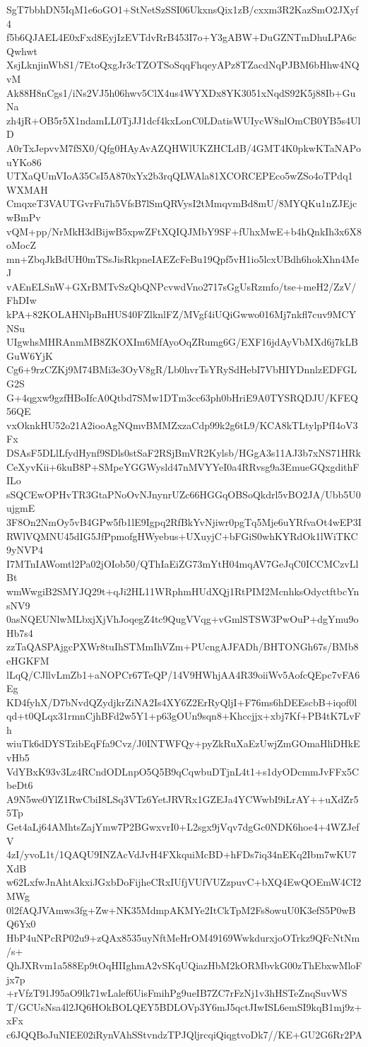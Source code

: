 SgT7bbhDN5IqM1e6oGO1+StNetSzSSI06UkxnsQix1zB/cxxm3R2KazSmO2JXyf4
f5b6QJAEL4E0xFxd8EyjIzEVTdvRrB453I7o+Y3gABW+DuGZNTmDhuLPA6cQwhwt
XsjLknjinWbS1/7EtoQxgJr3cTZOTSoSqqFhqeyAPz8TZacdNqPJBM6bHhw4NQvM
Ak88H8nCgs1/iNs2VJ5h06hwv5ClX4us4WYXDx8YK3051xNqdS92K5j88Ib+GuNa
zh4jR+OB5r5X1ndamLL0TjJJ1dcf4kxLonC0LDatisWUIycW8nlOmCB0YB5s4UlD
A0rTxJepvvM7fSX0/Qfg0HAyAvAZQHWlUKZHCLdB/4GMT4K0pkwKTaNAPouYKo86
UTXaQUmVIoA35CsI5A870xYx2b3rqQLWAla81XCORCEPEco5wZSo4oTPdq1WXMAH
CmqxeT3VAUTGvrFu7h5VfsB7lSmQRVysI2tMmqvmBd8mU/8MYQKu1nZJEjcwBmPv
vQM+pp/NrMkH3dBijwB5xpwZFtXQIQJMbY9SF+fUhxMwE+b4hQnkIh3x6X8oMocZ
mn+ZbqJkBdUH0mTSsJisRkpneIAEZcFeBu19Qpf5vH1io5lcxUBdh6hokXhn4MeJ
vAEnELSnW+GXrBMTvSzQbQNPcvwdVno2717sGgUsRzmfo/tse+meH2/ZzV/FhDIw
kPA+82KOLAHNlpBnHUS40FZlknlFZ/MVgf4iUQiGwwo016Mj7nkfl7cuv9MCYNSu
UIgwhsMHRAnmMB8ZKOXIm6MfAyoOqZRumg6G/EXF16jdAyVbMXd6j7kLBGuW6YjK
Cg6+9rzCZKj9M74BMi3e3OyV8gR/Lb0hvrTsYRySdHebI7VbHIYDnnlzEDFGLG2S
G+4qgxw9gzfHBoIfcA0Qtbd7SMw1DTm3cc63ph0bHriE9A0TYSRQDJU/KFEQ56QE
vxOknkHU52o21A2iooAgNQmvBMMZxzaCdp99k2g6tL9/KCA8kTLtylpPfI4oV3Fx
DSAsF5DLlLfydHynf9SDls0stSaF2RSjBmVR2Kylsb/HGgA3s11AJ3b7xNS71HRk
CeXyvKii+6kuB8P+SMpeYGGWysld47nMVYYeI0a4RRvsg9a3EmueGQxgdithFILo
sSQCEwOPHvTR3GtaPNoOvNJnynrUZc66HGGqOBSoQkdrl5vBO2JA/Ubb5U0ujgmE
3F8On2NmOy5vB4GPw5fb1lE9Igpq2RfBkYvNjiwr0pgTq5Mje6uYRfvaOt4wEP3I
RWlVQMNU45dIG5JfPpmofgHWyebus+UXuyjC+bFGiS0whKYRdOk1lWiTKC9yNVP4
I7MTnIAWomtl2Pa02jOIob50/QThIaEiZG73mYtH04mqAV7GeJqC0ICCMCzvLlBt
wmWwgiB2SMYJQ29t+qJi2HL11WRphmHUdXQj1RtPIM2McnhksOdyctftbcYnsNV9
0asNQEUNlwMLbxjXjVhJoqegZ4tc9QugVVqg+vGmlSTSW3PwOuP+dgYmu9oHb7s4
zzTaQASPAjgcPXWr8tuIhSTMmIhVZm+PUcngAJFADh/BHTONGh67s/BMb8eHGKFM
lLqQ/CJllvLmZb1+aNOPCr67TeQP/14V9HWhjAA4R39oiiWv5AofcQEpc7vFA6Eg
KD4fyhX/D7bNvdQZydjkrZiNA2Is4XY6Z2ErRyQljI+F76ms6hDEEscbB+iqof0l
qd+t0QLqx31rmnCjhBFd2w5Y1+p63gOUn9sqn8+Khccjjx+xbj7Kf+PB4tK7LvFh
wiuTk6dDYSTzibEqFfa9Cvz/J0INTWFQy+pyZkRuXaEzUwjZmGOmaHliDHkEvHb5
VdYBxK93v3Lz4RCndODLnpO5Q5B9qCqwbuDTjnL4t1+s1dyODcmmJvFFx5CbeDt6
A9N5we0YlZ1RwCbiI8LSq3VTz6YetJRVRx1GZEJa4YCWwbI9iLrAY++uXdZr55Tp
Get4aLj64AMhtsZajYmw7P2BGwxvrI0+L2sgx9jVqv7dgGc0NDK6hoe4+4WZJefV
4zI/yvoL1t/1QAQU9INZAcVdJvH4FXkquiMcBD+hFDs7iq34nEKq2Ibm7wKU7XdB
w62LxfwJnAhtAkxiJGxbDoFijheCRxIUfjVUfVUZzpuvC+bXQ4EwQOEmW4CI2MWg
0l2fAQJVAmws3fg+Zw+NK35MdmpAKMYe2ItCkTpM2Fs8owuU0K3efS5P0wBQ6Yx0
HbP4uNPcRP02u9+zQAx8535uyNftMeHrOM49169WwkdurxjoOTrkz9QFcNtNm/s+
QhJXRvm1a588Ep9tOqHIIghmA2vSKqUQiazHbM2kORMbvkG00zThEbxwMloFjx7p
+rVfzT91J95aO9lk71wLalef6UisFmihPg9ueIB7ZC7rFzNj1v3hHSTeZnqSuvWS
T/GCUsNsa4l2JQ6HOkBOLQEY5BDLOVp3Y6mJ5qctJIwISL6emSI9kqB1mj9z+xFx
c6JQQBoJuNIEE02iRynVAhSStvndzTPJQljrcqiQiqgtvoDk7//KE+GU2G6Rr2PA
